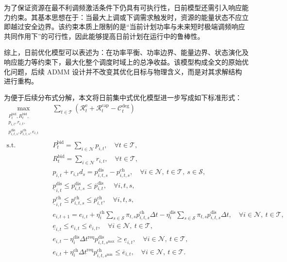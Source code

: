 为了保证资源在最不利调频激活条件下仍具有可执行性，日前模型还需引入响应能力约束。其基本思想在于：当最大上调或下调需求触发时，资源的能量状态不应立即越过安全边界。该约束本质上限制的是“当前计划功率与未来短时极端调频响应共同作用下”的可行性，因此能够提高日前计划在运行中的鲁棒性。

综上，日前优化模型可以表述为：在功率平衡、功率边界、能量边界、状态演化及响应能力等约束下，最大化整个调度时域上的总净收益。该模型构成全文的原始优化问题，后续 ADMM 设计并不改变其优化目标与物理含义，而是对其求解结构进行重构。

为便于后续分布式分解，本文将日前集中式优化模型进一步写成如下标准形式：
\begin{subequations}
\label{prob:vpp_dayahead_formal}
\begin{align}
\max_{\substack{P_t^{\mathrm{bid}}, R_t^{\mathrm{bid}},\\
p_{i,t}, r_{i,t},\\
p_{i,t,s}^{\mathrm{dis}}, p_{i,t,s}^{\mathrm{ch}}, e_{i,t}}}
\quad & \sum_{t \in \mathcal{T}} \left(\mathcal{R}_t^{\mathrm{e}} + \mathcal{R}_t^{\mathrm{cap}} - \mathcal{C}_t^{\mathrm{deg}}\right) \label{prob:vpp_dayahead_formal_obj} \\
\text{s.t.} \quad & P_t^{\mathrm{bid}} = \sum_{i \in \mathcal{N}} p_{i,t}, \quad \forall t \in \mathcal{T}, \label{prob:vpp_dayahead_formal_bidp} \\
& R_t^{\mathrm{bid}} = \sum_{i \in \mathcal{N}} r_{i,t}, \quad \forall t \in \mathcal{T}, \label{prob:vpp_dayahead_formal_bidr} \\
& p_{i,t} + r_{i,t} d_s = p_{i,t,s}^{\mathrm{dis}} - p_{i,t,s}^{\mathrm{ch}}, \quad \forall i \in \mathcal{N},\ t \in \mathcal{T},\ s \in \mathcal{S}, \label{prob:vpp_dayahead_formal_balance} \\
& \underline p_{i,t}^{\mathrm{dis}} \le p_{i,t,s}^{\mathrm{dis}} \le \overline p_{i,t}^{\mathrm{dis}}, \quad \forall i,t,s, \label{prob:vpp_dayahead_formal_pdis} \\
& \underline p_{i,t}^{\mathrm{ch}} \le p_{i,t,s}^{\mathrm{ch}} \le \overline p_{i,t}^{\mathrm{ch}}, \quad \forall i,t,s, \label{prob:vpp_dayahead_formal_pch} \\
& e_{i,t+1} = e_{i,t}
+ \eta_i^{\mathrm{ch}} \sum_{s \in \mathcal{S}} \pi_{t,s} p_{i,t,s}^{\mathrm{ch}} \Delta t
- \eta_i^{\mathrm{dis}} \sum_{s \in \mathcal{S}} \pi_{t,s} p_{i,t,s}^{\mathrm{dis}} \Delta t,
\quad \forall i \in \mathcal{N},\ t \in \mathcal{T}, \label{prob:vpp_dayahead_formal_energy} \\
& \underline e_{i,t} \le e_{i,t} \le \overline e_{i,t}, \quad \forall i \in \mathcal{N},\ t \in \mathcal{T}, \label{prob:vpp_dayahead_formal_energy_bounds} \\
& e_{i,t} - \eta_i^{\mathrm{dis}} \Delta t^{\mathrm{req}} p_{i,t,s^{\max}}^{\mathrm{dis}} \ge \underline e_{i,t}, \quad \forall i \in \mathcal{N},\ t \in \mathcal{T}, \label{prob:vpp_dayahead_formal_resp_down} \\
& e_{i,t} + \eta_i^{\mathrm{ch}} \Delta t^{\mathrm{req}} p_{i,t,s^{\min}}^{\mathrm{ch}} \le \overline e_{i,t}, \quad \forall i \in \mathcal{N},\ t \in \mathcal{T}. \label{prob:vpp_dayahead_formal_resp_up}
\end{align}
\end{subequations}
